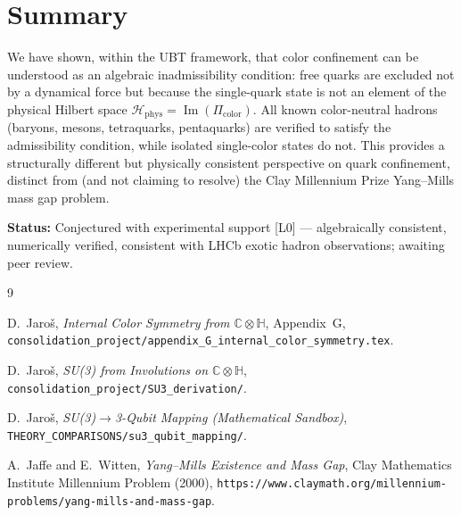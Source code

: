 \documentclass[12pt,a4paper]{article}
\newcommand{\Hphys}{\mathcal{H}_{\mathrm{phys}}}
\newcommand{\Picolor}{\Pi_{\mathrm{color}}}
\newcommand{\CCC}{\mathbb{C}}
\newcommand{\HH}{\mathbb{H}}
\begin{document}
\section*{Summary}

We have shown, within the UBT framework, that color confinement can be
understood as an algebraic inadmissibility condition: free quarks are excluded
not by a dynamical force but because the single-quark state is not an element of
the physical Hilbert space $\Hphys = \operatorname{Im}(\Picolor)$.  All known
color-neutral hadrons (baryons, mesons, tetraquarks, pentaquarks) are verified
to satisfy the admissibility condition, while isolated single-color states do not.
This provides a structurally different but physically consistent perspective on
quark confinement, distinct from (and not claiming to resolve) the Clay Millennium
Prize Yang--Mills mass gap problem.

\bigskip
\noindent\textbf{Status:} Conjectured with experimental support [L0] ---
algebraically consistent, numerically verified, consistent with LHCb exotic hadron
observations; awaiting peer review.

\begin{thebibliography}{9}

D.\ Jaroš, \textit{Internal Color Symmetry from $\CCC \otimes \HH$},
Appendix~G, \texttt{consolidation\_project/appendix\_G\_internal\_color\_symmetry.tex}.

D.\ Jaroš, \textit{SU(3) from Involutions on $\CCC \otimes \HH$},
\texttt{consolidation\_project/SU3\_derivation/}.

D.\ Jaroš, \textit{SU(3)$\to$3-Qubit Mapping (Mathematical Sandbox)},
\texttt{THEORY\_COMPARISONS/su3\_qubit\_mapping/}.

A.\ Jaffe and E.\ Witten, \textit{Yang--Mills Existence and Mass Gap},
Clay Mathematics Institute Millennium Problem (2000),
\texttt{https://www.claymath.org/millennium-problems/yang-mills-and-mass-gap}.

\end{thebibliography}
\end{document}
